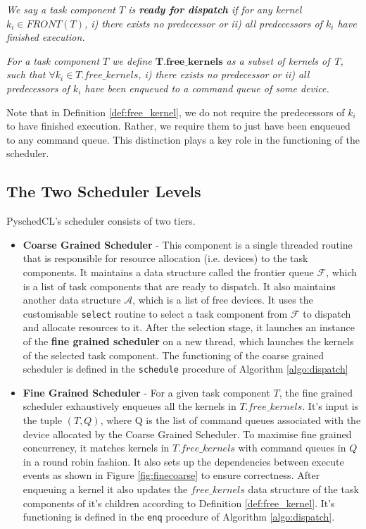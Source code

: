     \begin{definition}
        \emph{We say a task component $T$ is \textbf{ready for dispatch} if for any kernel $k_i \in FRONT(T)$, i) there exists no predecessor or ii) all predecessors of $k_i$ have finished execution.}
	\end{definition}
	
	\begin{definition} \label{def:free_kernel}
		\emph{For a task component $T$ we define $\mathbf{T.free\_kernels}$ as a subset of kernels of T, such that $\forall k_{i} \in T.free\_kernels$, i) there exists no predecessor or ii) all predecessors of $k_i$ have been enqueued to a command queue of some device.}
	\end{definition}

	
	Note that in Definition \ref{def:free_kernel}, we do not require the predecessors of $k_i$ to have finished execution. Rather, we require them to just have been enqueued to any command queue. This distinction plays a key role in the functioning of the scheduler. 
	
	
	\subsection{The Two Scheduler Levels}
	PyschedCL's scheduler consists of two tiers. 
	\begin{itemize}
		\item \textbf{Coarse Grained Scheduler} - This component is a single threaded routine that is responsible for resource allocation (i.e. devices) to the task components. It maintains a data structure called the frontier queue $\mathcal{F}$, which is a list of task components that are ready to dispatch. It also maintains another data structure $\mathcal{A}$, which is a list of free devices. It uses the customisable {\tt select} routine to select a task component from $\mathcal{F}$ to dispatch and allocate resources to it. After the selection stage, it launches an instance of the \textbf{fine grained scheduler} on a new thread, which launches the kernels of the selected task component. The functioning of the coarse grained scheduler is defined in the {\tt schedule} procedure of Algorithm \ref{algo:dispatch}
		\item \textbf{Fine Grained Scheduler} - For a given task component $T$, the fine grained scheduler exhaustively enqueues all the kernels in $T.free\_kernels$. It's input is the tuple $(T,Q)$, where Q is the list of command queues associated with the device allocated by the Coarse Grained Scheduler. To maximise fine grained concurrency, it matches kernels in $T.free\_kernels$ with command queues in $Q$ in a round robin fashion. It also sets up the dependencies between execute events as shown in Figure \ref{fig:finecoarse} to ensure correctness. After enqueuing a kernel it also updates the $free\_kernels$ data structure of the task components of it's children according to Definition \ref{def:free_kernel}. It's functioning is defined in the {\tt enq} procedure of Algorithm \ref{algo:dispatch}.
	\end{itemize}


